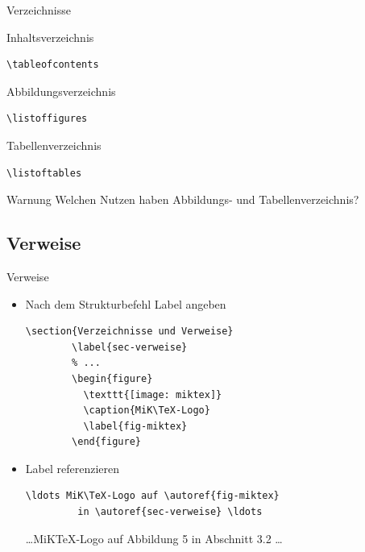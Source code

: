 \begin{Frame}[fragile]{Verzeichnisse}
  \begin{Block}{Inhaltsverzeichnis}
    \begin{lstlisting}[gobble=6,style=block]
      \tableofcontents
    \end{lstlisting}
  \end{Block}

  \begin{Block}{Abbildungsverzeichnis}
    \begin{lstlisting}[gobble=6,style=block]
      \listoffigures
    \end{lstlisting}
  \end{Block}

  \begin{Block}{Tabellenverzeichnis}
    \begin{lstlisting}[gobble=6,style=block]
      \listoftables
    \end{lstlisting}
  \end{Block}

  \xxx

  \begin{alertblock}{Warnung}
    Welchen Nutzen haben Abbildungs- und Tabellenverzeichnis?
  \end{alertblock}
\end{Frame}

\subsection{Verweise}

\begin{Frame}[fragile]{Verweise}
  \begin{itemize}
    \item \alert{Nach} dem Strukturbefehl Label angeben
      \begin{lstlisting}[gobble=8]
        \section{Verzeichnisse und Verweise}
        \label{sec-verweise}
        % ...
        \begin{figure}
          \texttt{[image: miktex]}
          \caption{MiK\TeX-Logo}
          \label{fig-miktex}
        \end{figure}
      \end{lstlisting}
     \item Label referenzieren
       \begin{lstlisting}[gobble=8]
         \ldots MiK\TeX-Logo auf \autoref{fig-miktex}
         in \autoref{sec-verweise} \ldots
       \end{lstlisting}
       \ldots MiK\TeX-Logo auf Abbildung 5 in Abschnitt 3.2 \ldots
  \end{itemize}
\end{Frame}

